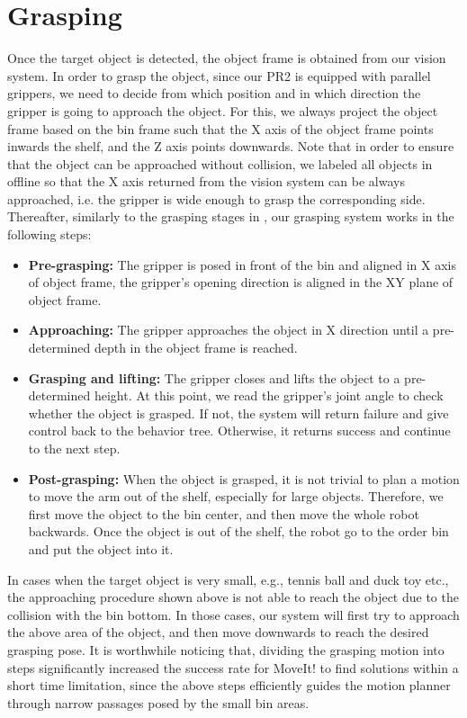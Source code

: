 \section{Grasping}
\label{sec:grasping}

Once the target object is detected, the object frame is obtained from our vision system. In order to grasp the object, since our PR2 is equipped with parallel grippers, we need to decide from which position and in which direction the gripper is going to approach the object. For this, we always project the object frame based on the bin frame such that the X axis of the object frame points inwards the shelf, and the Z axis points downwards. Note that in order to ensure that the object can be approached without collision, we labeled all objects in offline so that the X axis returned from the vision system can be always approached, i.e. the gripper is wide enough to grasp the corresponding side. Thereafter, similarly to the grasping stages in \cite{hang2016b}, our grasping system works in the following steps:
\begin{itemize}
 \item \textbf{Pre-grasping:} The gripper is posed in front of the bin and aligned in X axis of object frame, the gripper's opening direction is aligned in the XY plane of object frame.
 \item \textbf{Approaching:} The gripper approaches the object in X direction until a pre-determined depth in the object frame is reached.
 \item \textbf{Grasping and lifting:} The gripper closes and lifts the object to a pre-determined height. At this point, we read the gripper's joint angle to check whether the object is grasped. If not, the system will return failure and give control back to the behavior tree. Otherwise, it returns success and continue to the next step.
 \item \textbf{Post-grasping:} When the object is grasped, it is not trivial to plan a motion to move the arm out of the shelf, especially for large objects. Therefore, we first move the object to the bin center, and then move the whole robot backwards. Once the object is out of the shelf, the robot go to the order bin and put the object into it.
\end{itemize}
In cases when the target object is very small, e.g., tennis ball and duck toy etc., the approaching procedure shown above is not able to reach the object due to the collision with the bin bottom. In those cases, our system will first try to approach the above area of the object, and then move downwards to reach the desired grasping pose. It is worthwhile noticing that, dividing the grasping motion into steps significantly increased the success rate for MoveIt! to find solutions within a short time limitation, since the above steps efficiently guides the motion planner through narrow passages posed by the small bin areas. 
